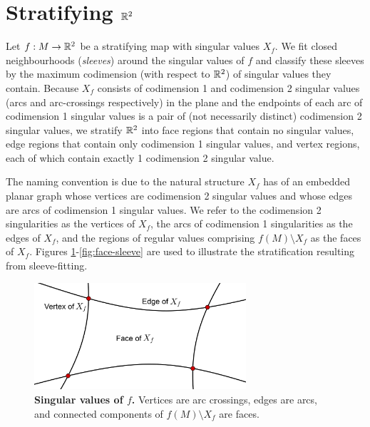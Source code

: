 \section{Stratifying $\mathbb{R}^2$}
\label{section:smooth-decompose}

Let $f:M\to\mathbb{R}^2$ be a stratifying map with singular values $X_f$.
We fit closed neighbourhoods (\emph{sleeves}) around the singular values of $f$ and classify these sleeves by the maximum codimension (with respect to $\mathbb{R}^2$) of singular values they contain.
Because $X_f$ consists of codimension 1 and codimension 2 singular values (arcs and arc-crossings respectively) in the plane and the endpoints of each arc of codimension 1 singular values is a pair of (not necessarily distinct) codimension 2 singular values,  we stratify $\mathbb{R}^2$ into face regions that contain no singular values, edge regions that contain only codimension 1 singular values, and vertex regions, each of which contain exactly 1 codimension 2 singular value.

The naming convention is due to the natural structure $X_f$ has of an embedded planar graph whose vertices are codimension 2 singular values and whose edges are arcs of codimension 1 singular values.
We refer to the codimension 2 singularities as the vertices of $X_f$, the arcs of codimension 1 singularities as the edges of $X_f$, and the regions of regular values comprising $f(M)\setminus X_f$ as the faces of $X_f$.
Figures \ref{fig:X_f}-\ref{fig:face-sleeve} are used to illustrate the stratification resulting from sleeve-fitting.

\begin{figure}[h!]
	\centering
	\includegraphics[width=0.7\textwidth]{figures/X_f.png}
	\caption{
		\textbf{Singular values of $f$.}
		Vertices are arc crossings, edges are arcs, and connected components of $f(M)\setminus X_f$ are faces.
	}
	\label{fig:X_f}
\end{figure}

